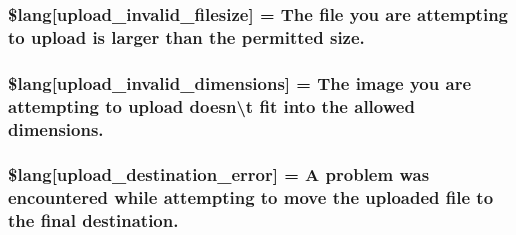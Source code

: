 \subsubsection[{\$lang}]{\setlength{\rightskip}{0pt plus 5cm}\$lang\mbox{[}\textquotesingle{}upload\+\_\+invalid\+\_\+filesize\textquotesingle{}\mbox{]} = \textquotesingle{}The file you are attempting to upload is larger than the permitted size.\textquotesingle{}}\label{_admin_2system_2language_2english_2upload__lang_8php_a832b3ec1d84b1d48a488cf525954d8f2}
\hypertarget{_admin_2system_2language_2english_2upload__lang_8php_a4e796eeccf7df90acffea7884a5bd558}{}
\subsubsection[{\$lang}]{\setlength{\rightskip}{0pt plus 5cm}\$lang\mbox{[}\textquotesingle{}upload\+\_\+invalid\+\_\+dimensions\textquotesingle{}\mbox{]} = \textquotesingle{}The image you are attempting to upload doesn\textbackslash{}\textquotesingle{}t fit into the allowed dimensions.\textquotesingle{}}\label{_admin_2system_2language_2english_2upload__lang_8php_a4e796eeccf7df90acffea7884a5bd558}
\hypertarget{_admin_2system_2language_2english_2upload__lang_8php_a31be70c748b9bfc43dd7468e1fa64c42}{}
\subsubsection[{\$lang}]{\setlength{\rightskip}{0pt plus 5cm}\$lang\mbox{[}\textquotesingle{}upload\+\_\+destination\+\_\+error\textquotesingle{}\mbox{]} = \textquotesingle{}A problem was encountered while attempting to move the uploaded file to the final destination.\textquotesingle{}}\label{_admin_2system_2language_2english_2upload__lang_8php_a31be70c748b9bfc43dd7468e1fa64c42}
\hypertarget{_admin_2system_2language_2english_2upload__lang_8php_a3c17908c53072c6a5ef593760aaaa704}{}
